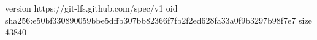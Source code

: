 version https://git-lfs.github.com/spec/v1
oid sha256:e50bf330890059bbe5dffb307bb82366f7fb2f2ed628fa33a0f9b3297b98f7e7
size 43840
